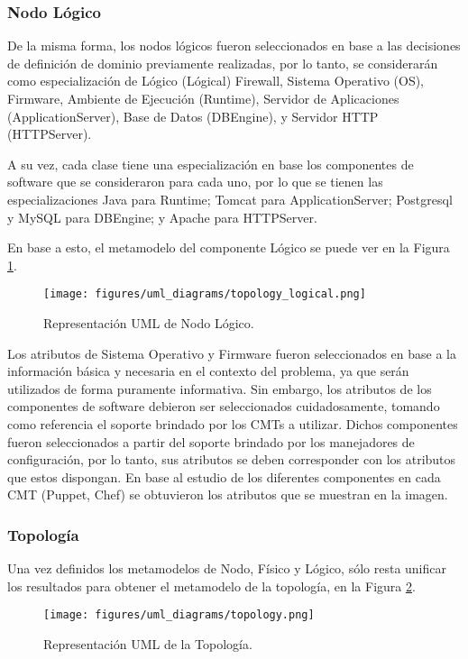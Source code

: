 \subsubsection{Nodo Lógico}
De la misma forma, los nodos lógicos fueron seleccionados en base a las decisiones de definición de dominio previamente realizadas, por lo tanto, se considerarán como especialización de Lógico (Lógical) Firewall, Sistema Operativo (OS), Firmware, Ambiente de Ejecución (Runtime), Servidor de Aplicaciones (ApplicationServer), Base de Datos (DBEngine), y Servidor HTTP (HTTPServer).

A su vez, cada clase tiene una especialización en base los componentes de software que se consideraron para cada uno, por lo que se tienen las especializaciones Java para Runtime; Tomcat para ApplicationServer; Postgresql y MySQL para DBEngine; y Apache para HTTPServer. 

En base a esto, el metamodelo del componente Lógico se puede ver en la Figura \ref{fig:uml:logical}.

\begin{figure}[htbp]
    \centering
    \texttt{[image: figures/uml\_diagrams/topology\_logical.png]}
    \caption{Representación UML de Nodo Lógico.}
    \label{fig:uml:logical}
\end{figure}

Los atributos de Sistema Operativo y Firmware fueron seleccionados en base a la información básica y necesaria en el contexto del problema, ya que serán utilizados de forma puramente informativa. 
Sin embargo, los atributos de los componentes de software debieron ser seleccionados cuidadosamente, tomando como referencia el soporte brindado por los CMTs a utilizar. Dichos componentes fueron seleccionados a partir del soporte brindado por los manejadores de configuración, por lo tanto, sus atributos se deben corresponder con los atributos que estos dispongan. 
En base al estudio de los diferentes componentes en cada CMT (Puppet, Chef) se obtuvieron los atributos que se muestran en la imagen.

\subsubsection{Topología}
Una vez definidos los metamodelos de Nodo, Físico y Lógico, sólo resta unificar los resultados para obtener el metamodelo de la topología, en la Figura \ref{fig:uml:topology}.

\begin{figure}[htbp]
    \centering
    \texttt{[image: figures/uml\_diagrams/topology.png]}
    \caption{Representación UML de la Topología.}
    \label{fig:uml:topology}
\end{figure}


